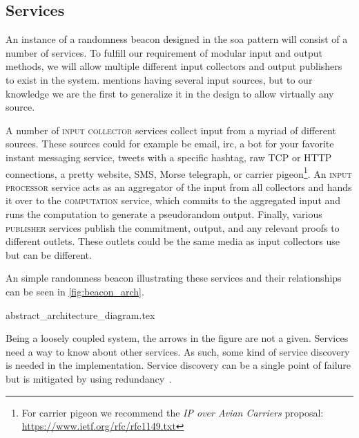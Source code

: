 \subsection{Services}%
\label{sub:components_of_a_beacon}

An instance of a randomness beacon designed in the \gls{soa} pattern will consist of a number of services.
To fulfill our requirement of modular input and output methods, we will allow multiple different input collectors and output publishers to exist in the system. \citet{randomzoo} mentions having several input sources, but to our knowledge we are the first to generalize it in the design to allow virtually any source.

A number of \textsc{input collector} services collect input from a myriad of different sources. These sources could for example be email, irc, a bot for your favorite instant messaging service, tweets with a specific hashtag, raw TCP or HTTP connections, a pretty website, SMS, Morse telegraph, or carrier pigeon\footnote{For carrier pigeon we recommend the \emph{IP over Avian Carriers} proposal: \url{https://www.ietf.org/rfc/rfc1149.txt}}.
An \textsc{input processor} service acts as an aggregator of the input from all collectors and hands it over to the \textsc{computation} service, which commits to the aggregated input and runs the computation to generate a pseudorandom output.
Finally, various \textsc{publisher} services publish the commitment, output, and any relevant proofs to different outlets. These outlets could be the same media as input collectors use but can be different.

An simple randomness beacon illustrating these services and their relationships can be seen in \cref{fig:beacon_arch}.

{abstract_architecture_diagram.tex}

Being a loosely coupled system, the arrows in the figure are not a given. Services need a way to know about other services. As such, some kind of service discovery is needed in the implementation. Service discovery can be a single point of failure but is mitigated by using redundancy~\cite{soa_redundancy}.
